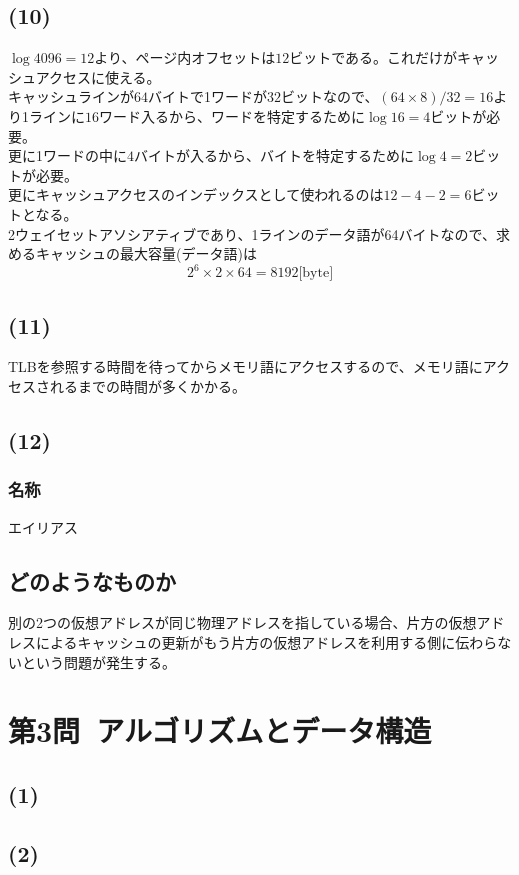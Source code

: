 \documentclass[a4paper,12pt,xelatex,ja=standard]{bxjsarticle}
\begin{document}
\subsection*{(10)}
$\log 4096 = 12$より、ページ内オフセットは$12$ビットである。これだけがキャッシュアクセスに使える。\\
キャッシュラインが$64$バイトで1ワードが$32$ビットなので、$(64 \times 8) / 32 = 16$より1ラインに$16$ワード入るから、ワードを特定するために$\log 16 = 4$ビットが必要。\\
更に1ワードの中に$4$バイトが入るから、バイトを特定するために$\log 4 = 2$ビットが必要。\\
更にキャッシュアクセスのインデックスとして使われるのは$12 - 4 - 2 = 6$ビットとなる。\\
2ウェイセットアソシアティブであり、1ラインのデータ語が64バイトなので、求めるキャッシュの最大容量(データ語)は
\[
  2^6 \times 2 \times 64 = 8192 \text{[byte]}
\]

\subsection*{(11)}
TLBを参照する時間を待ってからメモリ語にアクセスするので、メモリ語にアクセスされるまでの時間が多くかかる。

\subsection*{(12)}
\subsubsection*{名称}
エイリアス
\subsection*{どのようなものか}
別の2つの仮想アドレスが同じ物理アドレスを指している場合、片方の仮想アドレスによるキャッシュの更新がもう片方の仮想アドレスを利用する側に伝わらないという問題が発生する。

\section*{第3問\ アルゴリズムとデータ構造}
\subsection*{(1)}

\subsection*{(2)}
\end{document}
